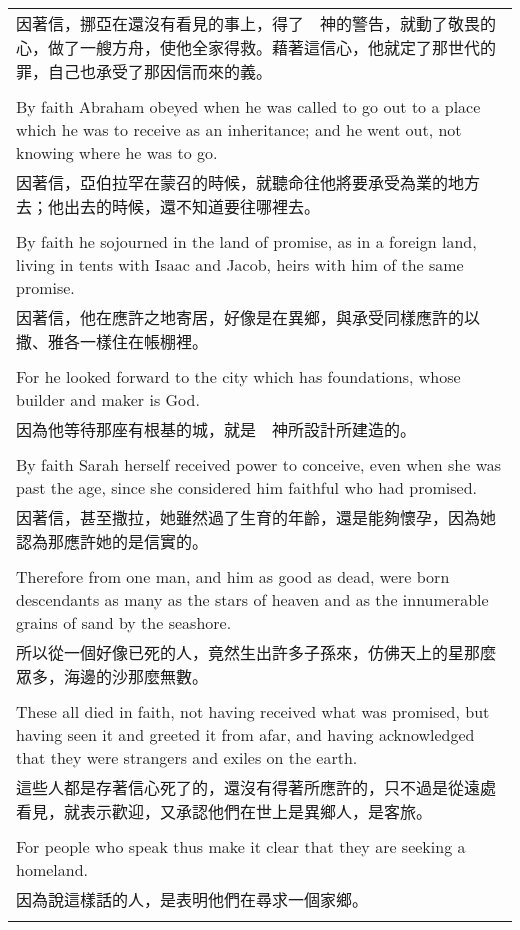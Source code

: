 \documentclass{book}
\begin{document}
\begin{tabularx}{\textwidth}{p{}}
因著信，挪亞在還沒有看見的事上，得了　神的警告，就動了敬畏的心，做了一艘方舟，使他全家得救。藉著這信心，他就定了那世代的罪，自己也承受了那因信而來的義。 \\ \\
By faith Abraham obeyed when he was called to go out to a place which he was to receive as an inheritance; and he went out, not knowing where he was to go. \\
因著信，亞伯拉罕在蒙召的時候，就聽命往他將要承受為業的地方去；他出去的時候，還不知道要往哪裡去。 \\ \\
By faith he sojourned in the land of promise, as in a foreign land, living in tents with Isaac and Jacob, heirs with him of the same promise. \\
因著信，他在應許之地寄居，好像是在異鄉，與承受同樣應許的以撒、雅各一樣住在帳棚裡。 \\ \\
For he looked forward to the city which has foundations, whose builder and maker is God. \\
因為他等待那座有根基的城，就是　神所設計所建造的。 \\ \\
By faith Sarah herself received power to conceive, even when she was past the age, since she considered him faithful who had promised. \\
因著信，甚至撒拉，她雖然過了生育的年齡，還是能夠懷孕，因為她認為那應許她的是信實的。 \\ \\
Therefore from one man, and him as good as dead, were born descendants as many as the stars of heaven and as the innumerable grains of sand by the seashore. \\
所以從一個好像已死的人，竟然生出許多子孫來，仿佛天上的星那麼眾多，海邊的沙那麼無數。 \\ \\
These all died in faith, not having received what was promised, but having seen it and greeted it from afar, and having acknowledged that they were strangers and exiles on the earth. \\
這些人都是存著信心死了的，還沒有得著所應許的，只不過是從遠處看見，就表示歡迎，又承認他們在世上是異鄉人，是客旅。 \\ \\
For people who speak thus make it clear that they are seeking a homeland. \\
因為說這樣話的人，是表明他們在尋求一個家鄉。 \\ \\

\end{tabularx}
\end{document}
